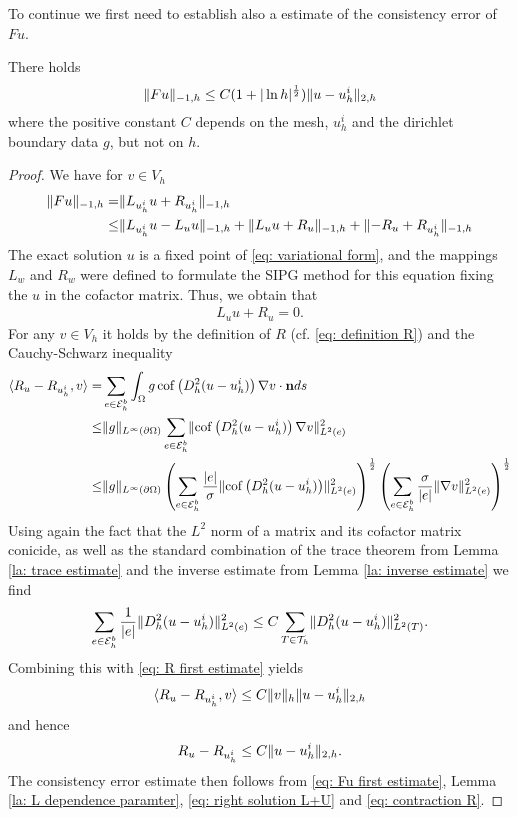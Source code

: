 To continue we first need to establish also a estimate of the consistency error of $Fu$.
\begin{lemma} \label{la: consistency error F}
	There holds
\[
	\lVert Fu \rVert_{-1,h} \leq C (1+|\ln h|^{\frac 1 2}) \lVert u-u_h^i \rVert_{2,h}
\]
	where the positive constant $C$ depends on the mesh, $u^i_h$ and the dirichlet boundary data $g$, but not on $h$. 
\end{lemma}
\begin{proof}
	We have for $v \in V_h$
	\begin{align}
		\lVert Fu \rVert_{-1,h} =& \lVert  L_{u^i_h}u + R_{u^i_h} \rVert_{-1,h} \nonumber\\
		                    \leq& \lVert  L_{u^i_h}u - L_u u \rVert_{-1,h} + \lVert  L_{u}u + R_u \rVert_{-1,h} + \lVert  -R_u + R_{u^i_h} \rVert_{-1,h} \label{eq: Fu first estimate}
	\end{align}	
	The exact solution $u$ is a fixed point of \eqref{eq: variational form}, and the mappings $L_w$ and $R_w$ were defined to formulate the SIPG method for this equation fixing the $u$ in the cofactor matrix. Thus, we obtain that 
	\begin{align}
		L_{u} u + R_u = 0. \label{eq: right solution L+U}
	\end{align}
	For any $v \in V_h$ it holds by the definition of $R$ (cf. \eqref{eq: definition R}) and the Cauchy-Schwarz inequality
	\begin{align}
		 \langle R_u - R_{u^i_h}, v \rangle 
			=& \sum_{e \in \mathcal{E}_h^b} \int_\Omega g \operatorname{cof} \left( D_h^2 (u-u_h^i) \right) \nabla v \cdot \mathbf n ds \nonumber \\
			\leq& \lVert g \rVert_{L^\infty(\partial \Omega)}
				 \sum_{e \in \mathcal{E}_h^b} \lVert  \operatorname{cof} \left( D_h^2 (u-u_h^i) \right) \nabla v  \rVert_{L^2(e)}^2 \nonumber \\
			\leq& \lVert g \rVert_{L^\infty(\partial \Omega)}
			\left( \sum_{e \in \mathcal{E}_h^b} \frac {|e|} \sigma \lVert  \operatorname{cof} \left( D_h^2 (u-u_h^i) \right) \rVert_{L^2(e)}^2  \right)^{\frac 1 2}
			\left( \sum_{e \in \mathcal{E}_h^b} \frac \sigma {|e|} \lVert \nabla v  \rVert_{L^2(e)}^2  \right)^{\frac 1 2}	 \label{eq: R first estimate}
	\end{align}
	Using again the fact that the $L^2$ norm of a matrix and its cofactor matrix conicide, as well as the standard combination of the trace theorem from Lemma \ref{la: trace estimate} and the inverse estimate from Lemma \ref{la: inverse estimate} we find
	\begin{align}
		\sum_{e \in \mathcal{E}_h^b} \frac 1 {|e|} \lVert  D_h^2 (u-u_h^i) \rVert_{L^2(e)}^2 
			\leq C \sum_{T \in \mathcal{T}_h} \lVert D_h^2 (u-u_h^i) \rVert_{L^2(T)}^2.
	\end{align}
	Combining this with \eqref{eq: R first estimate} yields
	\begin{align*}
		 \langle R_u - R_{u^i_h}, v \rangle \leq C \lVert v \rVert_{h} \lVert u-u_h^i \rVert_{2,h}
	\end{align*}
	and hence 
	\begin{align}
		{R_u - R_{u^i_h}} \leq C \lVert u-u_h^i \rVert_{2,h}. \label{eq: contraction R}
	\end{align}
	The consistency error estimate then follows from \eqref{eq: Fu first estimate}, Lemma \ref{la: L dependence paramter}, \eqref{eq: right solution L+U} and \eqref{eq: contraction R}.
\end{proof}

